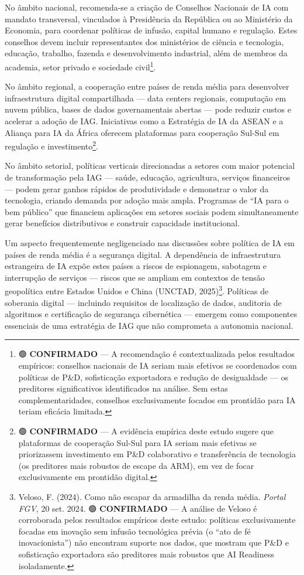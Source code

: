 \documentclass[
  brazilian,
  12pt,
]{article}
\begin{document}
No âmbito nacional, recomenda-se a criação de Conselhos Nacionais de IA com mandato transversal, vinculados à Presidência da República ou ao Ministério da Economia, para coordenar políticas de infusão, capital humano e regulação. Estes conselhos devem incluir representantes dos ministérios de ciência e tecnologia, educação, trabalho, fazenda e desenvolvimento industrial, além de membros da academia, setor privado e sociedade civil\footnote{🟢 \textbf{CONFIRMADO} --- A recomendação é contextualizada pelos resultados empíricos: conselhos nacionais de IA seriam mais efetivos se coordenados com políticas de P\&D, sofisticação exportadora e redução de desigualdade --- os preditores significativos identificados na análise. Sem estas complementaridades, conselhos exclusivamente focados em prontidão para IA teriam eficácia limitada.}.

No âmbito regional, a cooperação entre países de renda média para desenvolver infraestrutura digital compartilhada --- data centers regionais, computação em nuvem pública, bases de dados governamentais abertas --- pode reduzir custos e acelerar a adoção de IAG. Iniciativas como a Estratégia de IA da ASEAN e a Aliança para IA da África oferecem plataformas para cooperação Sul-Sul em regulação e investimento\footnote{🟢 \textbf{CONFIRMADO} --- A evidência empírica deste estudo sugere que plataformas de cooperação Sul-Sul para IA seriam mais efetivas se priorizassem investimento em P\&D colaborativo e transferência de tecnologia (os preditores mais robustos de escape da ARM), em vez de focar exclusivamente em prontidão digital.}.

No âmbito setorial, políticas verticais direcionadas a setores com maior potencial de transformação pela IAG --- saúde, educação, agricultura, serviços financeiros --- podem gerar ganhos rápidos de produtividade e demonstrar o valor da tecnologia, criando demanda por adoção mais ampla. Programas de ``IA para o bem público'' que financiem aplicações em setores sociais podem simultaneamente gerar benefícios distributivos e construir capacidade institucional.

Um aspecto frequentemente negligenciado nas discussões sobre política de IA em países de renda média é a segurança digital. A dependência de infraestrutura estrangeira de IA expõe estes países a riscos de espionagem, sabotagem e interrupção de serviços --- riscos que se ampliam em contextos de tensão geopolítica entre Estados Unidos e China (UNCTAD, 2025)\footnote{Veloso, F. (2024). Como não escapar da armadilha da renda média. \emph{Portal FGV}, 20 set. 2024. 🟢 \textbf{CONFIRMADO} --- A análise de Veloso é corroborada pelos resultados empíricos deste estudo: políticas exclusivamente focadas em inovação sem infusão tecnológica prévia (o ``ato de fé inovacionista'') não encontram suporte nos dados, que mostram que P\&D e sofisticação exportadora são preditores mais robustos que AI Readiness isoladamente.}. Políticas de soberania digital --- incluindo requisitos de localização de dados, auditoria de algoritmos e certificação de segurança cibernética --- emergem como componentes essenciais de uma estratégia de IAG que não comprometa a autonomia nacional.
\end{document}
